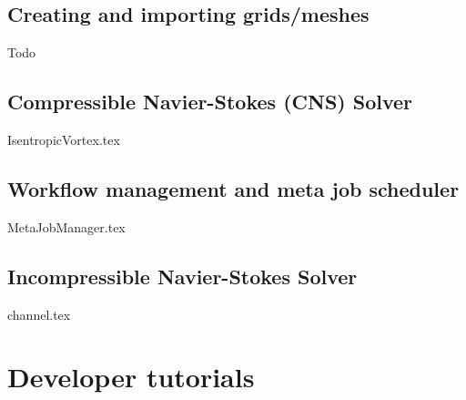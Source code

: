 \documentclass[a4paper,10pt]{report} %
\begin{document}
\chapter{Creating and importing grids/meshes }
\label{CNS}
Todo


\chapter{Compressible Navier-Stokes (CNS) Solver }
\label{CNS}
{IsentropicVortex.tex}

\chapter{Workflow management and meta job scheduler}
\label{sec:WorkflowMgm}
{MetaJobManager.tex}

\chapter{Incompressible Navier-Stokes Solver}
\label{IBM}
{channel.tex}

\part{Developer tutorials}
\label{sec:Tutorial}
\end{document}
